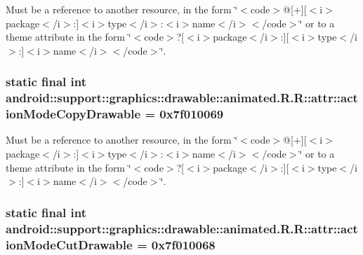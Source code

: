 Must be a reference to another resource, in the form \char`\"{}$<$code$>$@\mbox{[}+\mbox{]}\mbox{[}$<$i$>$package$<$/i$>$:\mbox{]}$<$i$>$type$<$/i$>$:$<$i$>$name$<$/i$>$$<$/code$>$\char`\"{} or to a theme attribute in the form \char`\"{}$<$code$>$?\mbox{[}$<$i$>$package$<$/i$>$:\mbox{]}\mbox{[}$<$i$>$type$<$/i$>$:\mbox{]}$<$i$>$name$<$/i$>$$<$/code$>$\char`\"{}. \hypertarget{classandroid_1_1support_1_1graphics_1_1drawable_1_1animated_1_1_r_1_1attr_d90a54dfaa4545d822b4109260a938e6}{
\subsubsection[{actionModeCopyDrawable}]{\setlength{\rightskip}{0pt plus 5cm}static final int android::support::graphics::drawable::animated.R.R::attr::actionModeCopyDrawable = 0x7f010069}}
\label{classandroid_1_1support_1_1graphics_1_1drawable_1_1animated_1_1_r_1_1attr_d90a54dfaa4545d822b4109260a938e6}


Must be a reference to another resource, in the form \char`\"{}$<$code$>$@\mbox{[}+\mbox{]}\mbox{[}$<$i$>$package$<$/i$>$:\mbox{]}$<$i$>$type$<$/i$>$:$<$i$>$name$<$/i$>$$<$/code$>$\char`\"{} or to a theme attribute in the form \char`\"{}$<$code$>$?\mbox{[}$<$i$>$package$<$/i$>$:\mbox{]}\mbox{[}$<$i$>$type$<$/i$>$:\mbox{]}$<$i$>$name$<$/i$>$$<$/code$>$\char`\"{}. \hypertarget{classandroid_1_1support_1_1graphics_1_1drawable_1_1animated_1_1_r_1_1attr_7aec173b8166feebd130eaba79c97d4f}{
\subsubsection[{actionModeCutDrawable}]{\setlength{\rightskip}{0pt plus 5cm}static final int android::support::graphics::drawable::animated.R.R::attr::actionModeCutDrawable = 0x7f010068}}
\label{classandroid_1_1support_1_1graphics_1_1drawable_1_1animated_1_1_r_1_1attr_7aec173b8166feebd130eaba79c97d4f}


